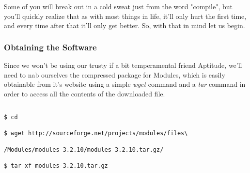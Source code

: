 \documentclass[]{article}
\begin{document}
                                                                         Some of you will break out in a cold sweat just from the word "compile", but you'll quickly realize that as 
                                                                         with  most things in life, it'll only hurt the first time, and every time after that it'll only get better. 
                                                                         So, with that in mind let us begin.

                                                                         \subsubsection{Obtaining the Software}
                                                                         Since we won't be using our trusty if a bit temperamental friend Aptitude, we'll need to nab ourselves the 
                                                                         compressed package for Modules, which is easily obtainable from it's website using a simple \textit{wget} command and 
                                                                         a \textit{tar} command in order to access all the contents of the downloaded file.
                                                                         \begin{lstlisting}
                                                                         $ cd
                                                                         $ wget http://sourceforge.net/projects/modules/files\
                                                                             /Modules/modules-3.2.10/modules-3.2.10.tar.gz/
                                                                             $ tar xf modules-3.2.10.tar.gz
                                                                             \end{lstlisting}
\end{document}
